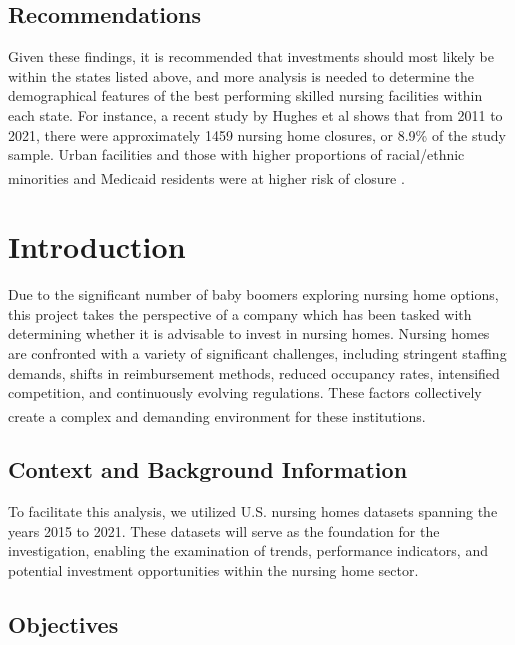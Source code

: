 \documentclass{article}
\theoremstyle{mytheoremstyle}
\theoremstyle{mytheoremstyle}
\theoremstyle{myproblemstyle}
\begin{document}
\subsection{Recommendations}

Given these findings, it is recommended that investments should most likely be within the states listed above, and more analysis is needed to determine the demographical features of the best performing skilled nursing facilities within each state. For instance, a recent study by Hughes et al shows that from 2011 to 2021, there were approximately 1459 nursing home closures, or 8.9\% of the study sample. Urban facilities and those with higher proportions of racial/ethnic minorities and Medicaid residents were at higher risk of closure \textsuperscript{\cite{hughes2023rates}}.
\pagebreak
\section{Introduction}

Due to the significant number of baby boomers exploring nursing home options, this project takes the perspective of a company which has been tasked with determining whether it is advisable to invest in nursing homes. Nursing homes are confronted with a variety of significant challenges, including stringent staffing demands, shifts in reimbursement methods, reduced occupancy rates, intensified competition, and continuously evolving regulations. These factors collectively create a complex and demanding environment for these institutions.\textsuperscript{\cite{tyler2017rebalance}}

\subsection{Context and Background Information}

To facilitate this analysis, we utilized U.S. nursing homes datasets spanning the years 2015 to 2021. These datasets will serve as the foundation for the investigation, enabling the examination of trends, performance indicators, and potential investment opportunities within the nursing home sector.

\subsection{Objectives}
\end{document}
